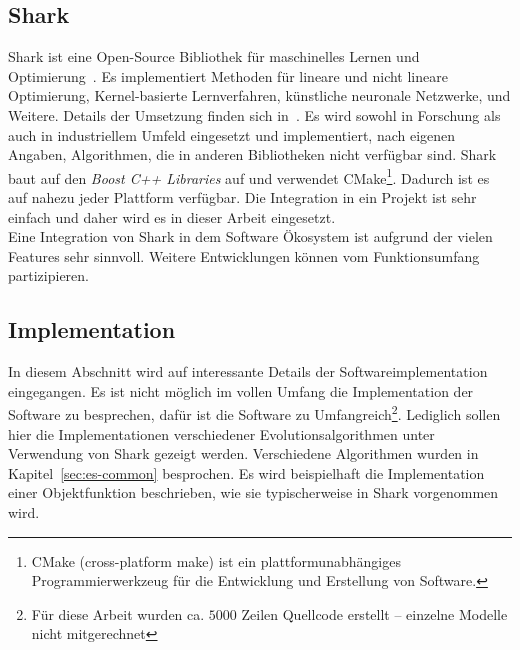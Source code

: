 %
\lstset{
	basicstyle=\scriptsize,
	language=C++,
	breaklines=true,
	frame=tbrl,
	breakatwhitespace=false
	breaklines=true,  
	xleftmargin=1cm,
	tabsize=2,
	showstringspaces=false}
%
\subsection{Shark}
\label{sec:Shark}
Shark ist eine Open-Source \cpp Bibliothek für maschinelles Lernen und Optimierung~\cite{Shark:1}. Es implementiert Methoden für lineare und nicht lineare Optimierung, Kernel-basierte Lernverfahren, künstliche neuronale Netzwerke, und Weitere. Details der Umsetzung finden sich in~\cite{shark08}. Es wird sowohl in Forschung als auch in industriellem Umfeld eingesetzt und implementiert, nach eigenen Angaben, Algorithmen, die in anderen Bibliotheken nicht verfügbar sind. Shark baut auf den \textit{Boost C++ Libraries} auf und verwendet CMake\footnote{CMake (cross-platform make) ist ein plattformunabhängiges Programmierwerkzeug für die Entwicklung und Erstellung von Software.}. Dadurch ist es auf nahezu jeder Plattform verfügbar. Die Integration in ein Projekt ist sehr einfach und daher wird es in dieser Arbeit eingesetzt.\\

Eine Integration von Shark in dem Software Ökosystem ist aufgrund der vielen Features sehr sinnvoll. Weitere Entwicklungen können vom Funktionsumfang partizipieren.

%
\subsection{Implementation}
\label{sec:Implementation}
In diesem Abschnitt wird auf interessante Details der Softwareimplementation eingegangen. Es ist nicht möglich im vollen Umfang die Implementation der Software zu besprechen, dafür ist die Software zu Umfangreich\footnote{Für diese Arbeit wurden ca. $5000$ Zeilen Quellcode erstellt -- einzelne Modelle nicht mitgerechnet}. Lediglich sollen hier die Implementationen verschiedener Evolutionsalgorithmen unter Verwendung von Shark gezeigt werden.
Verschiedene Algorithmen wurden in Kapitel~\ref{sec:es-common} besprochen.%
Es wird beispielhaft die Implementation einer Objektfunktion beschrieben, wie sie typischerweise in Shark vorgenommen wird.
%
%
%
